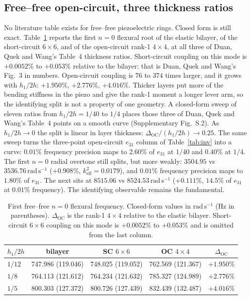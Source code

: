 \documentclass[11pt]{article}
\begin{document}
\subsection{Free--free open-circuit, three thickness ratios}
\label{sec:ffoc}
No literature table exists for free--free piezoelectric rings. Closed
form is still exact. Table~\ref{tab:ff} reports the first $n=0$ flexural
root of the elastic bilayer, of the short-circuit $6\times6$, and of the
open-circuit rank-1 $4\times4$, at all three of Duan, Quek and Wang's Table~4 thickness ratios.
Short-circuit coupling on this mode is $+0.0052\%$ to $+0.053\%$
relative to the bilayer: that is Duan, Quek and Wang's Fig.~3 in
numbers. Open-circuit coupling is $76$ to $374$ times larger, and it
grows with $h_1/2h$: $+1.950\%$, $+2.776\%$, $+4.016\%$. Thicker layers
put more of the bending stiffness in the piezo and give the rank-1
moment a longer lever arm, so the identifying split is not a property of
one geometry. A closed-form sweep of eleven ratios from $h_1/2h=1/40$
to $1/4$ places those three of Duan, Quek and Wang's Table~4 points on a smooth curve
(Supplementary Fig.~S.2). As $h_1/2h\to0$ the split is linear in layer
thickness: $\Delta_{\mathrm{OC}}/(h_1/2h)\to 0.25$. The same sweep
turns the three-point open-circuit $e_{31}$ column of
Table~\ref{tab:inv} into a curve: $0.01\%$ frequency precision maps to
$2.60\%$ of $e_{31}$ at $1/40$ and $0.40\%$ at $1/4$. The first $n=0$
radial overtone still splits, but more weakly: $3504.95$ vs
$3536.76\,\mathrm{rad\,s^{-1}}$ ($+0.908\%$, $k_{\mathrm{eff}}^2=0.0179$),
and $0.01\%$ frequency precision maps to $1.80\%$ of $e_{31}$. The next
sits at $8515.06$ vs $8524.53\,\mathrm{rad\,s^{-1}}$ ($+0.111\%$,
$14.5\%$ of $e_{31}$ at $0.01\%$ frequency). The identifying observable
remains the fundamental.

\begin{table}[H]
\centering
\caption{First free--free $n=0$ flexural frequency. Closed-form values
in $\mathrm{rad\,s^{-1}}$ (Hz in parentheses). $\Delta_{\mathrm{OC}}$
is the rank-1 $4\times4$ relative to the elastic bilayer. Short-circuit
$6\times6$ coupling on this mode is $+0.0052\%$ to $+0.053\%$ and is
omitted from the last column.}
\label{tab:ff}
\small
\begin{tabular}{@{}lcccc@{}}
\toprule
$h_1/2h$ & bilayer & SC $6\times6$ & OC $4\times4$ & $\Delta_{\mathrm{OC}}$ \\
\midrule
$1/12$ & 747.986 (119.046) & 748.025 (119.052) & 762.569 (121.367) & $+1.950\%$ \\
$1/8$  & 764.113 (121.612) & 764.234 (121.632) & 785.327 (124.989) & $+2.776\%$ \\
$1/5$  & 800.303 (127.372) & 800.726 (127.439) & 832.439 (132.487) & $+4.016\%$ \\
\bottomrule
\end{tabular}
\end{table}
\end{document}
